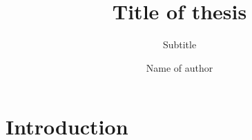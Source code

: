 \documentclass[
    11pt,			%
	]{uit-thesis}
\begin{document}

\title{Title of thesis}
\subtitle{Subtitle}			%
\author{Name of author}

\maketitle

\frontmatter

%


\begin{abstract}

\end{abstract}


\tableofcontents

\mainmatter

\chapter{Introduction}
\label{chapter:introduction}










\backmatter
\end{document}
